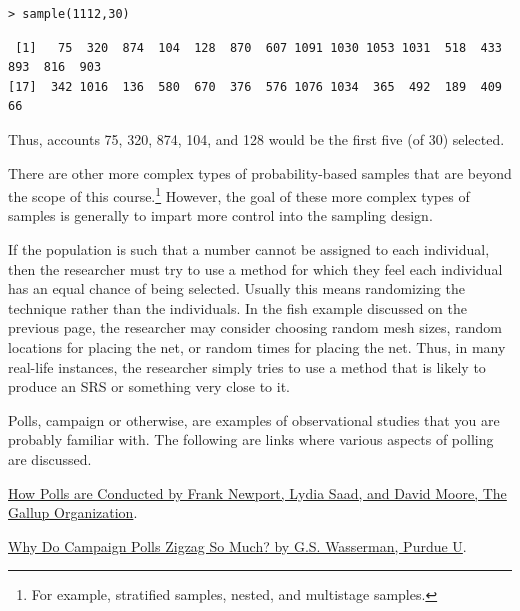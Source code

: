 \documentclass[10pt,openany]{book}\usepackage[]{graphicx}\usepackage[]{color}
\makeatletter
\newenvironment{kframe}{%
 \def\at@end@of@kframe{}%
 \ifinner\ifhmode%
  \def\at@end@of@kframe{\end{minipage}}%
  \begin{minipage}{\columnwidth}%
 \fi\fi%
 \def\FrameCommand##1{\hskip\@totalleftmargin \hskip-\fboxsep
 \colorbox{shadecolor}{##1}\hskip-\fboxsep
     \hskip-\linewidth \hskip-\@totalleftmargin \hskip\columnwidth}%
 \MakeFramed {\advance\hsize-\width
   \@totalleftmargin\z@ \linewidth\hsize
   \@setminipage}}%
 {\par\unskip\endMakeFramed%
 \at@end@of@kframe}
\newenvironment{knitrout}{}{} %
\makeatother
\begin{document}
\begin{knitrout}
\color{fgcolor}\begin{kframe}
\begin{verbatim}
> sample(1112,30)
\end{verbatim}
\end{kframe}
\end{knitrout}
\vspace{-12pt}
\begin{knitrout}
\color{fgcolor}\begin{kframe}
\begin{verbatim}
 [1]   75  320  874  104  128  870  607 1091 1030 1053 1031  518  433  893  816  903
[17]  342 1016  136  580  670  376  576 1076 1034  365  492  189  409   66
\end{verbatim}
\end{kframe}
\end{knitrout}

Thus, accounts 75, 320, 874, 104, and 128 would be the first five (of 30) selected.

There are other more complex types of probability-based samples that are beyond the scope of this course.\footnote{For example, stratified samples, nested, and multistage samples.} However, the goal of these more complex types of samples is generally to impart more control into the sampling design.


If the population is such that a number cannot be assigned to each individual, then the researcher must try to use a method for which they feel each individual has an equal chance of being selected. Usually this means randomizing the technique rather than the individuals. In the fish example discussed on the previous page, the researcher may consider choosing random mesh sizes, random locations for placing the net, or random times for placing the net. Thus, in many real-life instances, the researcher simply tries to use a method that is likely to produce an SRS or something very close to it.


Polls, campaign or otherwise, are examples of observational studies that you are probably familiar with. The following are links where various aspects of polling are discussed.
\begin{Itemize}
  \item \href{http://media.gallup.com/PDF/FAQ/HowArePolls.pdf}{How Polls are Conducted by Frank Newport, Lydia Saad, and David Moore, The Gallup Organization}.
  \item \href{http://www2.psych.purdue.edu/~codelab/Invalid.Polls.html}{Why Do Campaign Polls Zigzag So Much? by G.S. Wasserman, Purdue U}.
\end{Itemize}
\end{document}
